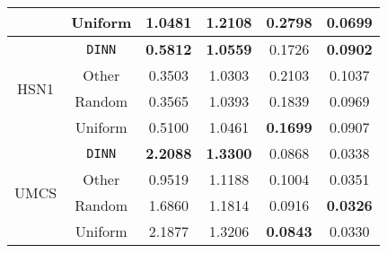 {\begin{tabular}{cccccc}
                       & Uniform     & \textbf{1.0481} & \textbf{1.2108}    & 0.2798            & 0.0699            \\ \hline
\multirow{4}{*}{HSN1}  & \texttt{DINN} & \textbf{0.5812} & \textbf{1.0559}    & 0.1726            & \textbf{0.0902}   \\
                       & Other       & 0.3503          & 1.0303             & 0.2103            & 0.1037            \\
                       & Random      & 0.3565          & 1.0393             & 0.1839            & 0.0969            \\
                       & Uniform     & 0.5100          & 1.0461             & \textbf{0.1699}   & 0.0907            \\ \hline
\multirow{4}{*}{UMCS}  & \texttt{DINN} & \textbf{2.2088} & \textbf{1.3300}    & 0.0868            & 0.0338            \\
                       & Other       & 0.9519          & 1.1188             & 0.1004            & 0.0351            \\
                       & Random      & 1.6860          & 1.1814             & 0.0916            & \textbf{0.0326}   \\
                       & Uniform     & 2.1877          & 1.3206             & \textbf{0.0843}   & 0.0330            \\ \hline
\end{tabular}}

